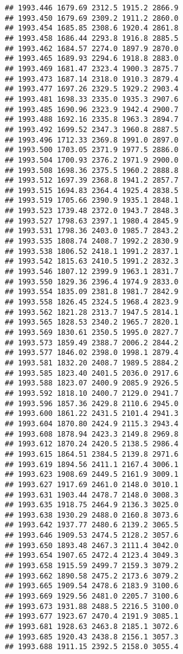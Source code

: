 \documentclass[
]{article}
\begin{document}
\begin{verbatim}
## 1993.446 1679.69 2312.5 1915.2 2866.9
## 1993.450 1679.69 2309.2 1911.2 2860.0
## 1993.454 1685.85 2308.6 1920.4 2861.8
## 1993.458 1686.44 2293.8 1916.8 2885.5
## 1993.462 1684.57 2274.0 1897.9 2870.0
## 1993.465 1689.93 2294.6 1918.8 2883.0
## 1993.469 1681.47 2323.4 1900.3 2875.7
## 1993.473 1687.14 2318.0 1910.3 2879.4
## 1993.477 1697.26 2329.5 1929.2 2903.4
## 1993.481 1698.33 2335.0 1935.3 2907.6
## 1993.485 1690.96 2323.9 1942.4 2900.7
## 1993.488 1692.16 2335.8 1963.3 2894.7
## 1993.492 1699.52 2347.3 1960.8 2887.5
## 1993.496 1712.33 2369.8 1991.0 2897.0
## 1993.500 1703.05 2371.9 1977.5 2886.0
## 1993.504 1700.93 2376.2 1971.9 2900.0
## 1993.508 1698.36 2375.5 1960.2 2888.8
## 1993.512 1697.39 2368.8 1941.2 2857.7
## 1993.515 1694.83 2364.4 1925.4 2838.5
## 1993.519 1705.66 2390.9 1935.1 2848.1
## 1993.523 1739.48 2372.0 1943.7 2848.3
## 1993.527 1798.63 2397.1 1980.4 2845.9
## 1993.531 1798.36 2403.0 1985.7 2843.2
## 1993.535 1808.74 2408.7 1992.2 2830.9
## 1993.538 1806.52 2418.1 1991.2 2837.1
## 1993.542 1815.63 2410.5 1991.2 2832.3
## 1993.546 1807.12 2399.9 1963.1 2831.7
## 1993.550 1829.36 2396.4 1974.9 2833.0
## 1993.554 1835.09 2381.8 1981.7 2842.9
## 1993.558 1826.45 2324.5 1968.4 2823.9
## 1993.562 1821.28 2313.7 1947.5 2814.1
## 1993.565 1828.53 2340.2 1965.7 2820.1
## 1993.569 1830.61 2350.5 1995.0 2827.7
## 1993.573 1859.49 2388.7 2006.2 2844.2
## 1993.577 1846.02 2398.0 1998.1 2879.4
## 1993.581 1832.20 2408.7 1989.5 2884.2
## 1993.585 1823.40 2401.5 2036.0 2917.6
## 1993.588 1823.07 2400.9 2085.9 2926.5
## 1993.592 1818.10 2400.7 2129.0 2941.7
## 1993.596 1857.36 2429.8 2110.6 2945.0
## 1993.600 1861.22 2431.5 2101.4 2941.3
## 1993.604 1870.80 2424.9 2115.3 2943.4
## 1993.608 1878.94 2423.3 2149.8 2969.8
## 1993.612 1870.24 2420.5 2138.5 2986.4
## 1993.615 1864.51 2384.5 2139.8 2971.6
## 1993.619 1894.56 2411.1 2167.4 3006.1
## 1993.623 1908.69 2449.5 2161.9 3009.1
## 1993.627 1917.69 2461.0 2148.0 3010.1
## 1993.631 1903.44 2478.7 2148.0 3008.3
## 1993.635 1918.75 2464.9 2136.3 3025.0
## 1993.638 1930.29 2488.0 2160.8 3073.6
## 1993.642 1937.77 2480.6 2139.2 3065.5
## 1993.646 1909.53 2474.5 2128.2 3057.6
## 1993.650 1893.48 2467.3 2111.4 3042.0
## 1993.654 1907.65 2472.4 2123.4 3049.3
## 1993.658 1915.59 2499.7 2159.3 3079.2
## 1993.662 1890.58 2475.2 2173.6 3079.2
## 1993.665 1909.54 2478.6 2183.9 3100.6
## 1993.669 1929.56 2481.0 2205.7 3100.6
## 1993.673 1931.88 2488.5 2216.5 3100.0
## 1993.677 1923.67 2470.4 2191.9 3085.1
## 1993.681 1928.63 2463.8 2185.1 3072.6
## 1993.685 1920.43 2438.8 2156.1 3057.3
## 1993.688 1911.15 2392.5 2158.0 3055.4

\end{verbatim}
\end{document}
